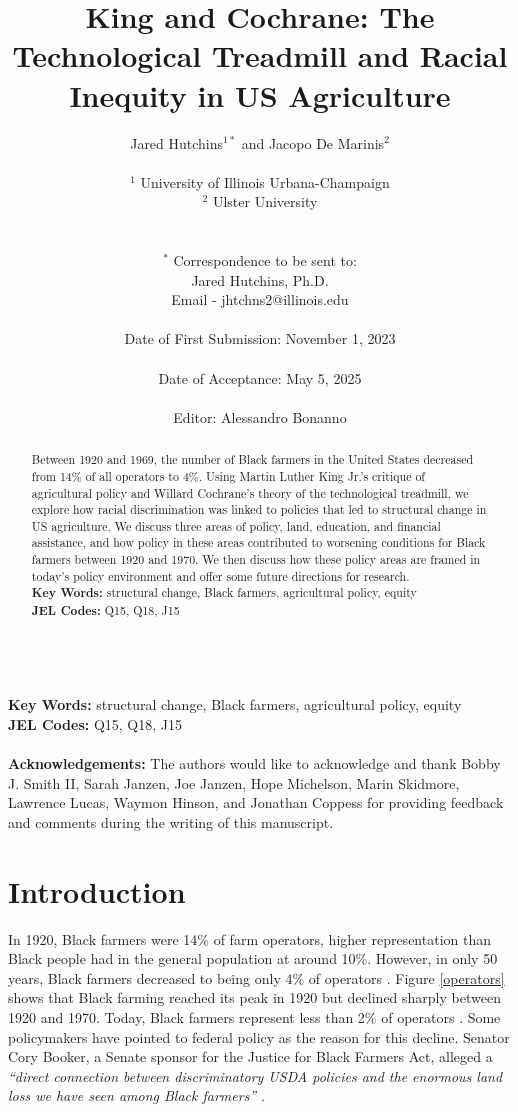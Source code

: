 \documentclass[12pt]{article}
\title{\LARGE King and Cochrane: 
The Technological Treadmill and Racial Inequity in US Agriculture}
\author{Jared Hutchins$^{1*}$ and Jacopo De Marinis$^{2}$ \\  \quad  \\ $^1$ University of Illinois Urbana-Champaign \\ $^2$ Ulster University\\  \quad  \\  \quad  \\ $^*$ Correspondence to be sent to:\\ Jared Hutchins, Ph.D. \\Email - jhtchns2@illinois.edu \\ \quad \\ Date of First Submission: November 1, 2023 \\ \quad \\ Date of Acceptance: May 5, 2025 \\ \quad \\
Editor: Alessandro Bonanno}
\date{}
\begin{document}
\maketitle
\quad \\
\textbf{Key Words:} structural change, Black farmers, agricultural policy, equity\\
\textbf{JEL Codes:} Q15, Q18, J15 \\
\quad \\
\textbf{Acknowledgements:} The authors would like to acknowledge and thank Bobby J. Smith II, Sarah Janzen, Joe Janzen, Hope Michelson, Marin Skidmore, Lawrence Lucas, Waymon Hinson, and Jonathan Coppess for providing feedback and comments during the writing of this manuscript.

\newpage

\begin{abstract}
\singlespacing
Between 1920 and 1969, the number of Black farmers in the United States decreased from 14\% of all operators to 4\%. 
Using Martin Luther King Jr.’s critique of agricultural policy and Willard Cochrane’s theory of the technological treadmill, we explore how racial discrimination was linked to policies that led to structural change in US agriculture. 
We discuss three areas of policy, land, education, and financial assistance, and how policy in these areas contributed to worsening conditions for Black farmers between 1920 and 1970.
We then discuss how these policy areas are framed in today's policy environment and offer some future directions for research.\\
\textbf{Key Words:} structural change, Black farmers, agricultural policy, equity\\
\textbf{JEL Codes:} Q15, Q18, J15
\end{abstract}
\newpage
\section*{Introduction}

\doublespacing

In 1920, Black farmers were 14\% of farm operators, higher representation than Black people had in the general population at around 10\%. 
However, in only 50 years, Black farmers decreased to being only 4\% of operators  \citep{francis_black_2022,reynolds_black_2002}.
Figure \ref{operators} shows that Black farming reached its peak in 1920 but declined sharply between 1920 and 1970.
Today, Black farmers represent less than 2\% of operators \citep{USDA_black_farmers}.
Some policymakers have pointed to federal policy as the reason for this decline. 
Senator Cory Booker, a Senate sponsor for the Justice for Black Farmers Act, alleged a \textit{``direct connection between discriminatory USDA policies and the enormous land loss we have seen among Black farmers''} \citep{booker_booker_2023}. 
\end{document}
